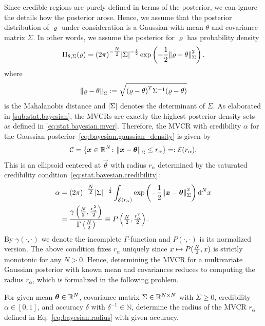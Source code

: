 Since credible regions are purely defined in terms of the posterior, we can ignore the details how the posterior arose.
Hence, we assume that the posterior distribution of $\varrho$ under consideration is a Gaussian with mean $\theta$ and covariance matrix $\Sigma$.
In other words, we assume the posterior for $\varrho$ has probability density
\[
  \label{eq:bayesian.gaussian_density}
  \Pi_{\theta,\Sigma}(\varrho) = {(2\pi)}^{-\tfrac{N}{2}} {\vert\Sigma\vert}^{-\frac{1}{2}} \exp\left( -\frac{1}{2} {\Vert\varrho - \theta\Vert}_\Sigma^2 \right).
\]
where
\[
  {\Vert\varrho - \theta\Vert}_\Sigma := \sqrt{{(\varrho - \theta)}^T \Sigma^{-1} (\varrho - \theta)}
\]
is the Mahalanobis distance and  ${\vert\Sigma\vert}$ denotes the determinant of $\Sigma$.
As elaborated in \cref{sub:stat.bayesian}, the MVCRs are exactly the highest posterior density sets as defined in \cref{eq:stat.bayesian.mvcr}.
Therefore, the MVCR with credibility $\alpha$ for the Gaussian posterior~\eqref{eq:bayesian.gaussian_density} is given by
\[
  \label{eq:bayesian.gaussian_cr}
  \mathcal{C} = \{ {\boldsymbol{x}} \in \mathbb{R}^N\colon {\Vert{\boldsymbol{x}} - {\boldsymbol{\theta}}\Vert}_\Sigma \le r_{\alpha} \} =: \mathcal{E}(r_{\alpha}).
\]
This is an ellipsoid centered at $\vec\theta$ with radius $r_{\alpha}$ determined by the saturated credibility condition~\eqref{eq:stat.bayesian.credibility}:
\[
  \label{eq:bayesian.radius}
  \begin{split}
    \alpha
    &= {(2\pi)}^{-\tfrac{N}{2}} {\vert\Sigma\vert}^{-\frac{1}{2}} \int_{\mathcal{E}(r_{\alpha})} \exp\left( -\frac{1}{2} {\Vert{\boldsymbol{x}} - {\boldsymbol{\theta}}\Vert}_\Sigma^2 \right) \mathrm{d}^N x \\
    &= \frac{\gamma\left( \tfrac{N}{2}, \frac{r^2_{\alpha}}{2} \right)}{\Gamma\left( \tfrac{N}{2} \right)}
    \equiv P\left( \tfrac{N}{2}, \tfrac{r^2_{\alpha}}{2} \right).
    \end{split}
\]
By $\gamma(\cdot,\cdot)$ we denote the incomplete $\Gamma$-function and $P(\cdot,\cdot)$ is its normalized version.
The above condition fixes $r_{\alpha}$ uniquely since $x \mapsto P(\tfrac{N}{2}, x)$ is strictly monotonic for any $N > 0$.
Hence, determining the MVCR for a multivariate Gaussian posterior with known mean and covariances reduces to computing the radius $r_\alpha$, which is formalized in the following problem.
\begin{problem}\label{prob:bayesian.cr}
  For given mean ${\boldsymbol{\theta}} \in \mathbb{R}^N$, covariance matrix $\Sigma \in \mathbb{R}^{N \times N}$ with $\Sigma \geq 0$, credibility $\alpha \in [0,1]$, and accuracy $\delta$ with $\delta^{-1} \in \mathbb{N}$, determine the radius of the MVCR $r_{\alpha}$ defined in Eq.~\eqref{eq:bayesian.radius} with given accuracy.
\end{problem}
